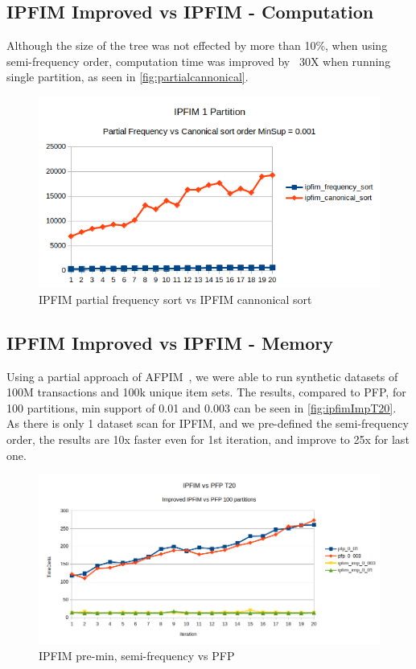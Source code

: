 \subsection{IPFIM Improved vs IPFIM - Computation}
Although the size of the tree was not effected by more than 10\%, when using semi-frequency order, computation time was improved by ~30X when running single partition, as seen in \autoref{fig:partialcannonical}.
\begin{figure}
  \centering
  \includegraphics[width=\linewidth]{figures/ipfim_freq_vs_can_sort}
  \caption{IPFIM partial frequency sort vs IPFIM cannonical sort}
  \label{fig:partialcannonical}
\end{figure}

\subsection{IPFIM Improved vs IPFIM - Memory}
Using a partial approach of AFPIM~\cite{koh2004efficient}, we were able to run synthetic datasets of 100M transactions and 100k unique item sets. The results, compared to PFP, for 100 partitions, min support of 0.01 and 0.003 can be seen  in \autoref{fig:ipfimImpT20}. As there is only 1 dataset scan for IPFIM, and we pre-defined the semi-frequency order, the results are 10x faster even for 1st iteration, and improve to 25x for last one.

\begin{figure}
  \centering
  \includegraphics[width=\linewidth]{figures/t20_ipfim_imp_vs_pfp}
  \caption{IPFIM pre-min, semi-frequency vs PFP}
  \label{fig:ipfimImpT20}
\end{figure}

